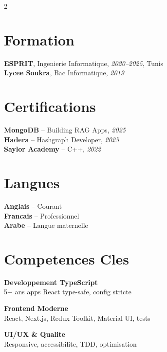 \documentclass[10pt,a4paper]{article}
\begin{document}
\vspace{6pt}
\begin{multicols}{2}

\section*{Formation}
{\small
\textbf{ESPRIT}, Ingenierie Informatique, \textit{2020--2025}, Tunis\\[1pt]
\textbf{Lycee Soukra}, Bac Informatique, \textit{2019}
}

\vspace{3pt}
\section*{Certifications}
{\small
\textbf{MongoDB} -- Building RAG Apps, \textit{2025}\\[1pt]
\textbf{Hadera} -- Hashgraph Developer, \textit{2025}\\[1pt]
\textbf{Saylor Academy} -- C++, \textit{2022}
}

\columnbreak

\section*{Langues}
{\small
\textbf{Anglais} -- Courant\\[1pt]
\textbf{Francais} -- Professionnel\\[1pt]
\textbf{Arabe} -- Langue maternelle
}

\vspace{3pt}
\section*{Competences Cles}
{\small
\textbf{Developpement TypeScript}\\[1pt]
5+ ans apps React type-safe, config stricte

\vspace{4pt}
\textbf{Frontend Moderne}\\[1pt]
React, Next.js, Redux Toolkit, Material-UI, tests

\vspace{4pt}
\textbf{UI/UX \& Qualite}\\[1pt]
Responsive, accessibilite, TDD, optimisation
}

\end{multicols}
\end{document}
